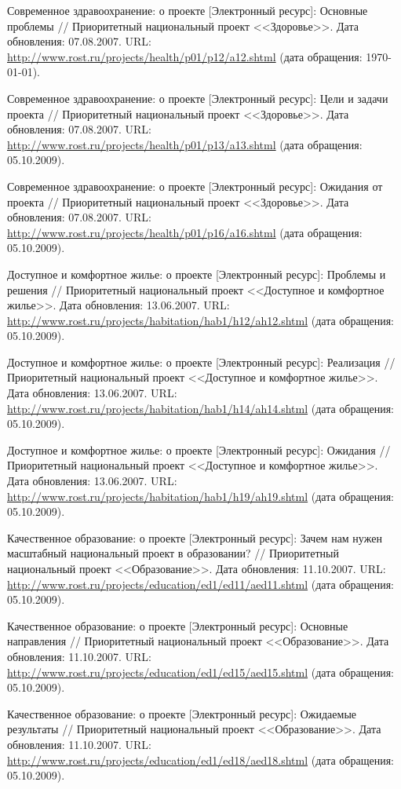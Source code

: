 \begin{thebibliography}{99}
 Современное здравоохранение: о проекте
  [Электронный ресурс]: Основные проблемы // Приоритетный национальный
  проект <<Здоровье>>. Дата обновления: 07.08.2007. URL:
  \url{http://www.rost.ru/projects/health/p01/p12/a12.shtml} (дата
  обращения: \today).

 Современное здравоохранение: о проекте
  [Электронный ресурс]: Цели и задачи проекта // Приоритетный
  национальный проект <<Здоровье>>. Дата обновления: 07.08.2007. URL:
  \url{http://www.rost.ru/projects/health/p01/p13/a13.shtml} (дата
  обращения: 05.10.2009).

 Современное здравоохранение: о проекте
  [Электронный ресурс]: Ожидания от проекта // Приоритетный
  национальный проект <<Здоровье>>. Дата обновления: 07.08.2007. URL:
  \url{http://www.rost.ru/projects/health/p01/p16/a16.shtml} (дата
  обращения: 05.10.2009).

 Доступное и комфортное жилье: о проекте
  [Электронный ресурс]: Проблемы и решения // Приоритетный
  национальный проект <<Доступное и комфортное жилье>>. Дата
  обновления: 13.06.2007. URL:
  \url{http://www.rost.ru/projects/habitation/hab1/h12/ah12.shtml}
  (дата обращения: 05.10.2009).

 Доступное и комфортное жилье: о проекте
  [Электронный ресурс]: Реализация // Приоритетный национальный проект
  <<Доступное и комфортное жилье>>. Дата обновления: 13.06.2007. URL:
  \url{http://www.rost.ru/projects/habitation/hab1/h14/ah14.shtml}
  (дата обращения: 05.10.2009).

 Доступное и комфортное жилье: о проекте
  [Электронный ресурс]: Ожидания // Приоритетный национальный проект
  <<Доступное и комфортное жилье>>. Дата обновления: 13.06.2007. URL:
  \url{http://www.rost.ru/projects/habitation/hab1/h19/ah19.shtml}
  (дата обращения: 05.10.2009).

 Качественное образование: о проекте
  [Электронный ресурс]: Зачем нам нужен масштабный национальный проект
  в образовании? // Приоритетный национальный проект
  <<Образование>>. Дата обновления: 11.10.2007. URL:
  \url{http://www.rost.ru/projects/education/ed1/ed11/aed11.shtml}
  (дата обращения: 05.10.2009).

 Качественное образование: о проекте [Электронный
  ресурс]: Основные направления // Приоритетный национальный проект
  <<Образование>>. Дата обновления: 11.10.2007. URL:
  \url{http://www.rost.ru/projects/education/ed1/ed15/aed15.shtml}
  (дата обращения: 05.10.2009).

 Качественное образование: о проекте
  [Электронный ресурс]: Ожидаемые результаты // Приоритетный
  национальный проект <<Образование>>. Дата обновления:
  11.10.2007. URL:
  \url{http://www.rost.ru/projects/education/ed1/ed18/aed18.shtml}
  (дата обращения: 05.10.2009).


  
\end{thebibliography}

